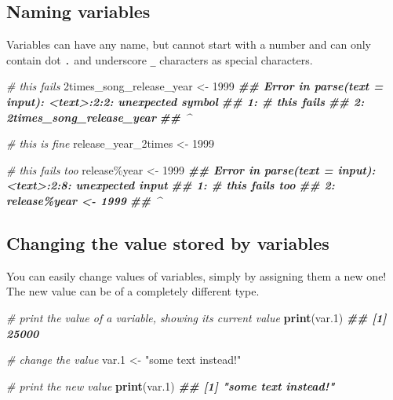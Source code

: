 \documentclass[
]{book}
\newenvironment{Shaded}{\begin{snugshade}}{\end{snugshade}}
\newcommand{\CommentTok}[1]{\textcolor[rgb]{0.56,0.35,0.01}{\textit{#1}}}
\newcommand{\DecValTok}[1]{\textcolor[rgb]{0.00,0.00,0.81}{#1}}
\newcommand{\DocumentationTok}[1]{\textcolor[rgb]{0.56,0.35,0.01}{\textbf{\textit{#1}}}}
\newcommand{\FunctionTok}[1]{\textcolor[rgb]{0.13,0.29,0.53}{\textbf{#1}}}
\newcommand{\NormalTok}[1]{#1}
\newcommand{\OtherTok}[1]{\textcolor[rgb]{0.56,0.35,0.01}{#1}}
\newcommand{\StringTok}[1]{\textcolor[rgb]{0.31,0.60,0.02}{#1}}
\begin{document}
\subsection{Naming variables}\label{naming-variables}

Variables can have any name, but cannot start with a number and can only contain dot \texttt{.} and underscore \texttt{\_} characters as special characters.

\begin{Shaded}
\begin{Highlighting}[]
\CommentTok{\# this fails}
\DecValTok{2}\NormalTok{times\_song\_release\_year }\OtherTok{\textless{}{-}} \DecValTok{1999}
\DocumentationTok{\#\# Error in parse(text = input): \textless{}text\textgreater{}:2:2: unexpected symbol}
\DocumentationTok{\#\# 1: \# this fails}
\DocumentationTok{\#\# 2: 2times\_song\_release\_year}
\DocumentationTok{\#\#     \^{}}
\end{Highlighting}
\end{Shaded}

\begin{Shaded}
\begin{Highlighting}[]
\CommentTok{\# this is fine}
\NormalTok{release\_year\_2times }\OtherTok{\textless{}{-}} \DecValTok{1999}
\end{Highlighting}
\end{Shaded}

\begin{Shaded}
\begin{Highlighting}[]
\CommentTok{\# this fails too}
\NormalTok{release\%year }\OtherTok{\textless{}{-}} \DecValTok{1999}
\DocumentationTok{\#\# Error in parse(text = input): \textless{}text\textgreater{}:2:8: unexpected input}
\DocumentationTok{\#\# 1: \# this fails too}
\DocumentationTok{\#\# 2: release\%year \textless{}{-} 1999}
\DocumentationTok{\#\#           \^{}}
\end{Highlighting}
\end{Shaded}

\subsection{Changing the value stored by variables}\label{changing-the-value-stored-by-variables}

You can easily change values of variables, simply by assigning them a new one! The new value can be of a completely different type.

\begin{Shaded}
\begin{Highlighting}[]
\CommentTok{\# print the value of a variable, showing its current value}
\FunctionTok{print}\NormalTok{(var.1)}
\DocumentationTok{\#\# [1] 25000}

\CommentTok{\# change the value}
\NormalTok{var.1 }\OtherTok{\textless{}{-}} \StringTok{"some text instead!"}

\CommentTok{\# print the new value}
\FunctionTok{print}\NormalTok{(var.1)}
\DocumentationTok{\#\# [1] "some text instead!"}
\end{Highlighting}
\end{Shaded}
\end{document}
